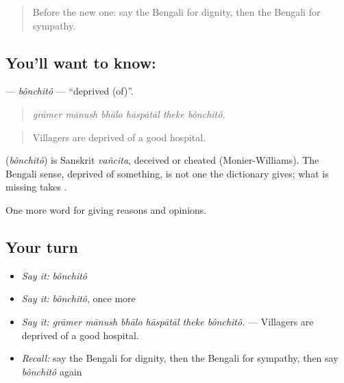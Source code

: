 \begin{quote}
Before the new one: say the Bengali for dignity, then the Bengali for sympathy.
\end{quote}

\subsection*{You'll want to know: }
\textbf{} — \emph{bônchitô} — \textquotedblleft{}deprived (of)\textquotedblright{}.

\begin{quote}
     
\end{quote}

\begin{quote}
\emph{grāmer mānush bhālo hāspātāl theke bônchitô.}
\end{quote}

\begin{quote}
Villagers are deprived of a good hospital.
\end{quote}

\begin{cousinweb}
\textbf{} (\emph{bônchitô}) is Sanskrit \emph{vañcita}, deceived or cheated (Monier-Williams). The Bengali sense, deprived of something, is not one the dictionary gives; what is missing takes .
\end{cousinweb}

\begin{grammarlens}[title={What you've built}]
One more word for giving reasons and opinions.
\end{grammarlens}

\subsection*{Your turn}
\begin{itemize}
\raggedright
  \item \emph{Say it:} \emph{bônchitô}
  \item \emph{Say it:} \emph{bônchitô}, once more
  \item \emph{Say it:} \emph{grāmer mānush bhālo hāspātāl theke bônchitô.} — Villagers are deprived of a good hospital.
  \item \emph{Recall:} say the Bengali for dignity, then the Bengali for sympathy, then say \emph{bônchitô} again
\end{itemize}

